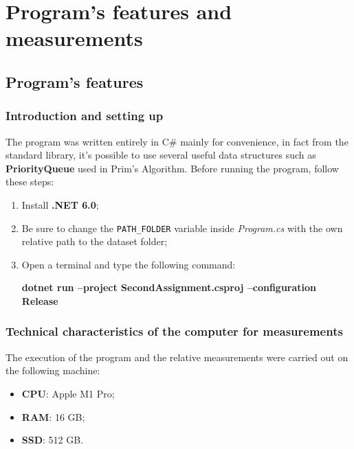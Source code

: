 \section{Program's features and measurements}

\subsection{Program's features}

\subsubsection{Introduction and setting up}
The program was written entirely in C\# mainly for convenience, in fact from the standard library, it's possible to 
use several useful data structures such as \textbf{PriorityQueue} used in Prim's Algorithm.
Before running the program, follow these steps:
\begin{enumerate}
    \item Install \textbf{.NET 6.0};
    \item Be sure to change the \verb|PATH_FOLDER| variable inside \textit{Program.cs} with the own relative path to the dataset folder;
    \item Open a terminal and type the following command:\\
        \centerline{\textbf{dotnet run --project SecondAssignment.csproj --configuration Release}}
\end{enumerate}

\subsubsection{Technical characteristics of the computer for measurements}
The execution of the program and the relative measurements were carried out on the following machine:
\begin{itemize}
    \item \textbf{CPU}: Apple M1 Pro;
    \item \textbf{RAM}: 16 GB;
    \item \textbf{SSD}: 512 GB.
\end{itemize}


